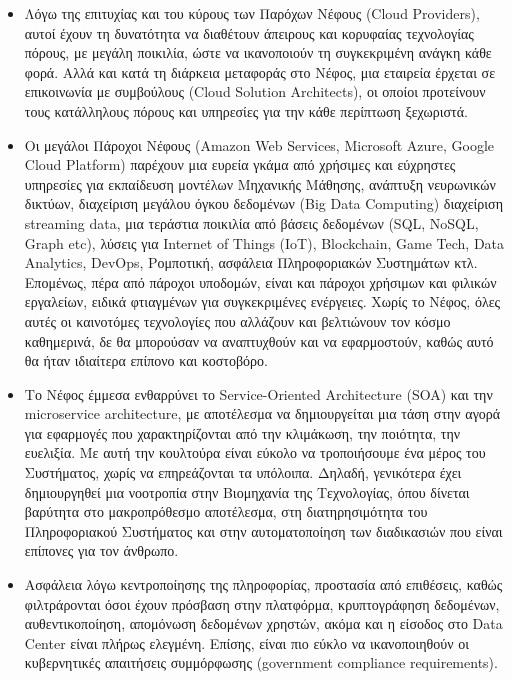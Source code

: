 \documentclass{article}
\begin{document}
\begin{itemize}
\item	Λόγω της επιτυχίας και του κύρους των Παρόχων Νέφους (Cloud Providers), αυτοί έχουν τη δυνατότητα να διαθέτουν άπειρους και κορυφαίας τεχνολογίας πόρους, με μεγάλη ποικιλία, ώστε να ικανοποιούν τη συγκεκριμένη ανάγκη κάθε φορά. Αλλά και κατά τη διάρκεια μεταφοράς στο Νέφος, μια εταιρεία έρχεται σε επικοινωνία με συμβούλους (Cloud Solution Architects), οι οποίοι προτείνουν τους κατάλληλους πόρους και υπηρεσίες για την κάθε περίπτωση ξεχωριστά.

\item	Οι μεγάλοι Πάροχοι Νέφους (Amazon Web Services, Microsoft Azure, Google Cloud Platform) παρέχουν μια ευρεία γκάμα από χρήσιμες και εύχρηστες υπηρεσίες για εκπαίδευση μοντέλων Μηχανικής Μάθησης, ανάπτυξη νευρωνικών δικτύων, διαχείριση μεγάλου όγκου δεδομένων (Big Data Computing) διαχείριση streaming data, μια τεράστια ποικιλία από βάσεις δεδομένων (SQL, NoSQL, Graph etc), λύσεις για Internet of Things (IoT), Blockchain, Game Tech, Data Analytics, DevOps, Ρομποτική, ασφάλεια Πληροφοριακών Συστημάτων κτλ. Επομένως, πέρα από πάροχοι υποδομών, είναι και πάροχοι χρήσιμων και φιλικών εργαλείων, ειδικά φτιαγμένων για συγκεκριμένες ενέργειες. Χωρίς το Νέφος, όλες αυτές οι καινοτόμες τεχνολογίες που αλλάζουν και βελτιώνουν τον κόσμο καθημερινά, δε θα μπορούσαν να αναπτυχθούν και να εφαρμοστούν, καθώς αυτό θα ήταν ιδιαίτερα επίπονο και κοστοβόρο.

\item	Το Νέφος έμμεσα ενθαρρύνει το Service-Oriented Architecture (SOA) και την microservice architecture, με αποτέλεσμα να δημιουργείται μια τάση στην αγορά για εφαρμογές που χαρακτηρίζονται από την κλιμάκωση, την ποιότητα, την ευελιξία. Με αυτή την κουλτούρα είναι εύκολο να τροποιήσουμε ένα μέρος του Συστήματος, χωρίς να επηρεάζονται τα υπόλοιπα. Δηλαδή, γενικότερα έχει δημιουργηθεί μια νοοτροπία στην Βιομηχανία της Τεχνολογίας, όπου δίνεται βαρύτητα στο μακροπρόθεσμο αποτέλεσμα, στη διατηρησιμότητα του Πληροφοριακού Συστήματος και στην αυτοματοποίηση των διαδικασιών που είναι επίπονες για τον άνθρωπο.

\item	Ασφάλεια λόγω κεντροποίησης της πληροφορίας, προστασία από επιθέσεις, καθώς φιλτράρονται όσοι έχουν πρόσβαση στην πλατφόρμα, κρυπτογράφηση δεδομένων, αυθεντικοποίηση, απομόνωση δεδομένων χρηστών, ακόμα και η είσοδος στο Data Center είναι πλήρως ελεγμένη. Επίσης, είναι πιο εύκλο να ικανοποιηθούν οι κυβερνητικές απαιτήσεις συμμόρφωσης (government compliance requirements).


\end{itemize}
\end{document}

